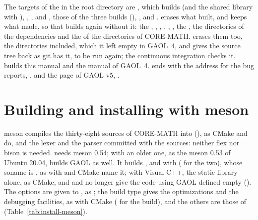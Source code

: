 \documentclass[12pt,a4paper,twoside,openright]{book}
\begin{document}
\medskip
The targets of the  in the root directory are ,
which builds  (and the shared library 
with ), , ,  and
, those of the three builds (),
,  and .  erases what
 built, and keeps what  made, so that 
builds again without it: the , ,
, , ,
, the ,
the  directories of the dependencies and the  of
the directories of CORE-MATH.  erases them too, the
 directories included, which it left empty in GAOL~4, and gives
the source tree back as git has it,  to be run again; the
continuous integration checks it.\newinvfive{} 
builds this manual and the manual of GAOL~4.  ends with
the address for the bug reports, , and the page of
GAOL v5, .

\section{Building and installing with meson}\label{sec:install-meson}
%

\begin{cmdshell}
\end{cmdshell}

\noindent
meson compiles the thirty-eight sources of CORE-MATH into 
(), as CMake and  do, and the lexer and
the parser committed with the sources: neither flex nor bison is needed.
 needs meson 0.54; with an older one, as the meson 0.53 of
Ubuntu 20.04,  builds GAOL as well. It builds
, and  with
 ( for the two), whose soname is
, as  with  and
CMake name it; with Visual C++, the static library alone, as CMake, and
 and  no longer give the code using GAOL
 defined empty ().\newinvfive{}
The options are given to , as
; the build type gives the optimizations
and the debugging facilities, as with CMake ( for
the  build), and the others are those of 
(Table~\ref{tab:install-meson}).
\end{document}
